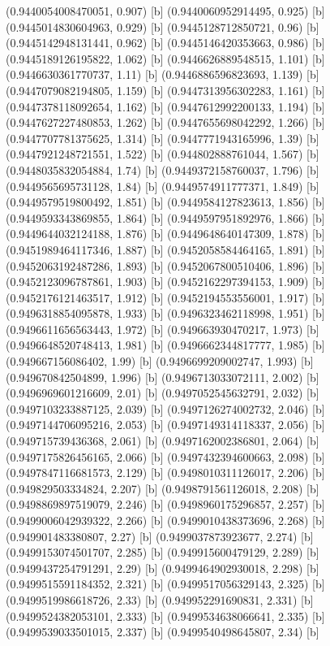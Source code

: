 {{{(0.9440054008470051, 0.907) [b] 
(0.9440060952914495, 0.925) [b] 
(0.9445014830604963, 0.929) [b] 
(0.9445128712850721, 0.96) [b] 
(0.9445142948131441, 0.962) [b] 
(0.9445146420353663, 0.986) [b] 
(0.9445189126195822, 1.062) [b] 
(0.9446626889548515, 1.101) [b] 
(0.9446630361770737, 1.11) [b] 
(0.9446886596823693, 1.139) [b] 
(0.9447079082194805, 1.159) [b] 
(0.9447313956302283, 1.161) [b] 
(0.9447378118092654, 1.162) [b] 
(0.9447612992200133, 1.194) [b] 
(0.9447627227480853, 1.262) [b] 
(0.9447655698042292, 1.266) [b] 
(0.9447707781375625, 1.314) [b] 
(0.9447771943165996, 1.39) [b] 
(0.9447921248721551, 1.522) [b] 
(0.944802888761044, 1.567) [b] 
(0.9448035832054884, 1.74) [b] 
(0.9449372158760037, 1.796) [b] 
(0.9449565695731128, 1.84) [b] 
(0.9449574911777371, 1.849) [b] 
(0.9449579519800492, 1.851) [b] 
(0.9449584127823613, 1.856) [b] 
(0.9449593343869855, 1.864) [b] 
(0.9449597951892976, 1.866) [b] 
(0.9449644032124188, 1.876) [b] 
(0.9449648640147309, 1.878) [b] 
(0.9451989464117346, 1.887) [b] 
(0.9452058584464165, 1.891) [b] 
(0.9452063192487286, 1.893) [b] 
(0.9452067800510406, 1.896) [b] 
(0.9452123096787861, 1.903) [b] 
(0.9452162297394153, 1.909) [b] 
(0.9452176121463517, 1.912) [b] 
(0.9452194553556001, 1.917) [b] 
(0.9496318854095878, 1.933) [b] 
(0.9496323462118998, 1.951) [b] 
(0.9496611656563443, 1.972) [b] 
(0.949663930470217, 1.973) [b] 
(0.9496648520748413, 1.981) [b] 
(0.9496662344817777, 1.985) [b] 
(0.949667156086402, 1.99) [b] 
(0.9496699209002747, 1.993) [b] 
(0.949670842504899, 1.996) [b] 
(0.9496713033072111, 2.002) [b] 
(0.9496969601216609, 2.01) [b] 
(0.9497052545632791, 2.032) [b] 
(0.9497103233887125, 2.039) [b] 
(0.9497126274002732, 2.046) [b] 
(0.9497144706095216, 2.053) [b] 
(0.9497149314118337, 2.056) [b] 
(0.949715739436368, 2.061) [b] 
(0.9497162002386801, 2.064) [b] 
(0.9497175826456165, 2.066) [b] 
(0.9497432394600663, 2.098) [b] 
(0.9497847116681573, 2.129) [b] 
(0.9498010311126017, 2.206) [b] 
(0.949829503334824, 2.207) [b] 
(0.9498791561126018, 2.208) [b] 
(0.9498869897519079, 2.246) [b] 
(0.9498960175296857, 2.257) [b] 
(0.9499006042939322, 2.266) [b] 
(0.9499010438373696, 2.268) [b] 
(0.949901483380807, 2.27) [b] 
(0.9499037873923677, 2.274) [b] 
(0.9499153074501707, 2.285) [b] 
(0.949915600479129, 2.289) [b] 
(0.9499437254791291, 2.29) [b] 
(0.9499464902930018, 2.298) [b] 
(0.9499515591184352, 2.321) [b] 
(0.9499517056329143, 2.325) [b] 
(0.9499519986618726, 2.33) [b] 
(0.949952291690831, 2.331) [b] 
(0.9499524382053101, 2.333) [b] 
(0.9499534638066641, 2.335) [b] 
(0.9499539033501015, 2.337) [b] 
(0.9499540498645807, 2.34) [b] 
}}}
